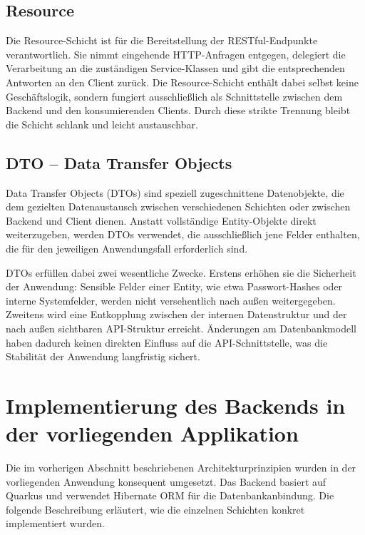 \subsection{Resource}

Die Resource-Schicht ist für die Bereitstellung der RESTful-Endpunkte verantwortlich.
Sie nimmt eingehende HTTP-Anfragen entgegen, delegiert die Verarbeitung an die
zuständigen Service-Klassen und gibt die entsprechenden Antworten an den Client zurück.
Die Resource-Schicht enthält dabei selbst keine Geschäftslogik, sondern fungiert
ausschließlich als Schnittstelle zwischen dem Backend und den konsumierenden Clients.
Durch diese strikte Trennung bleibt die Schicht schlank und leicht austauschbar.

\subsection{DTO -- Data Transfer Objects}

Data Transfer Objects (DTOs) sind speziell zugeschnittene Datenobjekte, die dem
gezielten Datenaustausch zwischen verschiedenen Schichten oder zwischen Backend und
Client dienen. Anstatt vollständige Entity-Objekte direkt weiterzugeben, werden DTOs
verwendet, die ausschließlich jene Felder enthalten, die für den jeweiligen
Anwendungsfall erforderlich sind.

DTOs erfüllen dabei zwei wesentliche Zwecke. Erstens erhöhen sie die Sicherheit der
Anwendung: Sensible Felder einer Entity, wie etwa Passwort-Hashes oder interne
Systemfelder, werden nicht versehentlich nach außen weitergegeben. Zweitens wird
eine Entkopplung zwischen der internen Datenstruktur und der nach außen sichtbaren
API-Struktur erreicht. Änderungen am Datenbankmodell haben dadurch keinen direkten
Einfluss auf die API-Schnittstelle, was die Stabilität der Anwendung langfristig
sichert.


\section{Implementierung des Backends in der vorliegenden Applikation}

Die im vorherigen Abschnitt beschriebenen Architekturprinzipien wurden in der
vorliegenden Anwendung konsequent umgesetzt. Das Backend basiert auf Quarkus und
verwendet Hibernate ORM für die Datenbankanbindung. Die folgende Beschreibung
erläutert, wie die einzelnen Schichten konkret implementiert wurden.

